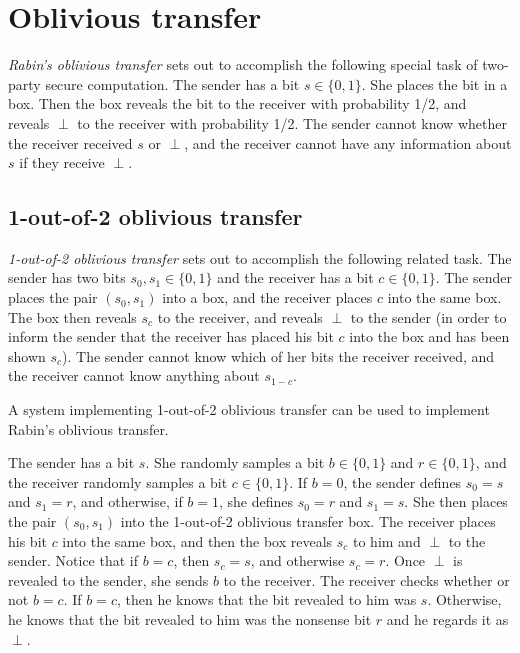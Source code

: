 \section{Oblivious transfer}

\emph{Rabin's oblivious transfer} sets out to accomplish the following special task of two-party secure computation. The sender has a bit $s \in \{0,1\}$. She places the bit in a box. Then the box reveals the bit to the receiver with probability 1/2, and reveals $\perp$ to the receiver with probability 1/2. The sender cannot know whether the receiver received $s$ or $\perp$, and the receiver cannot have any information about $s$ if they receive $\perp$.

\subsection{1-out-of-2 oblivious transfer}
\emph{1-out-of-2 oblivious transfer} sets out to accomplish the following related task. The sender has two bits $s_0, s_1 \in \{0,1\}$ and the receiver has a bit $c \in \{0,1\}$. The sender places the pair $(s_0, s_1)$ into a box, and the receiver places $c$ into the same box. The box then reveals $s_c$ to the receiver, and reveals $\perp$ to the sender (in order to inform the sender that the receiver has placed his bit $c$ into the box and has been shown $s_c$). The sender cannot know which of her bits the receiver received, and the receiver cannot know anything about $s_{1-c}$.

\begin{lemma}
A system implementing 1-out-of-2 oblivious transfer can be used to implement Rabin's oblivious transfer.
\end{lemma}

\proof
The sender has a bit $s$. She randomly samples a bit $b \in \{0,1\}$ and $r \in \{0,1\}$, and the receiver randomly samples a bit $c \in \{0,1\}$. If $b = 0$, the sender defines $s_0 = s$ and $s_1 = r$, and otherwise, if $b = 1$, she defines $s_0 = r$ and $s_1 = s$. She then places the pair $(s_0, s_1)$ into the 1-out-of-2 oblivious transfer box. The receiver places his bit $c$ into the same box, and then the box reveals $s_c$ to him and $\perp$ to the sender. Notice that if $b = c$, then $s_c = s$, and otherwise $s_c = r$. Once $\perp$ is revealed to the sender, she sends $b$ to the receiver. The receiver checks whether or not $b = c$. If $b = c$, then he knows that the bit revealed to him was $s$. Otherwise, he knows that the bit revealed to him was the nonsense bit $r$ and he regards it as $\perp$. \\

